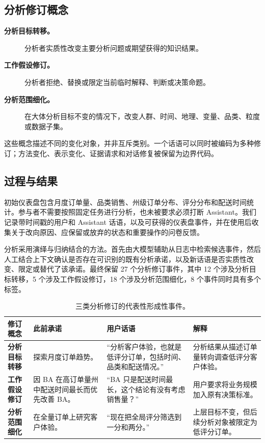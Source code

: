 \documentclass[UTF8,a4paper,10.5pt]{ctexart}
\begin{document}
\subsection{分析修订概念}

\begin{description}
\item[\textbf{分析目标转移。}]
分析者实质性改变主要分析问题或期望获得的知识结果。

\item[\textbf{工作假设修订。}]
分析者拒绝、替换或限定当前临时解释、判断或决策命题。

\item[\textbf{分析范围细化。}]
在大体分析目标不变的情况下，改变人群、时间、地理、变量、品类、粒度或数据子集。
\end{description}

这些概念描述不同的变化对象，并非互斥类别。一个话语可以同时被编码为多种修订；方法变化、表示变化、证据请求和对话修复被保留为边界代码。

\subsection{过程与结果}

初始仪表盘包含月度订单量、品类销售、州级订单分布、评分分布和配送时间统计。参与者不需要按照固定任务进行分析，也未被要求必须打断 Assistant。我们记录带时间戳的用户和 Assistant 话语，以及可获得的仪表盘事件，并在使用后收集关于改向原因、应保留或放弃的状态和重要操作的问卷反馈。

分析采用演绎与归纳结合的方法。首先由大模型辅助从日志中检索候选事件，然后人工结合上下文确认是否存在可识别的既有分析承诺，以及新话语是否实质性改变、限定或替代了该承诺。最终保留 27 个分析修订事件，其中 12 个涉及分析目标转移，5 个涉及工作假设修订，18 个涉及分析范围细化，8 个事件同时具有多个标签。

\begin{table}[t]
\centering
\caption{三类分析修订的代表性形成性事件。}
\label{tab:formative-episodes-zh}
\small
\begin{tabularx}{\textwidth}{p{}p{}Xp{}}
\toprule
\textbf{修订概念} & \textbf{此前承诺} & \textbf{用户话语} & \textbf{解释} \\
\midrule
\textbf{分析目标转移} & 探索月度订单趋势。 & “分析客户体验，也就是低评分订单，包括时间、品类和配送情况。” & 分析结果从描述订单量转向调查低评分客户体验。 \\
\textbf{工作假设修订} & 因 BA 在高订单量州中配送时间最长而优先改善 BA。 & “BA 只是配送时间最长，这个结论有没有考虑销售量？” & 用户要求将业务规模加入原有决策标准。 \\
\textbf{分析范围细化} & 在全量订单上研究客户体验。 & “现在把全局评分筛选到一分和两分。” & 上层目标不变，但后续分析对象被限定为低评分订单。 \\
\bottomrule
\end{tabularx}
\end{table}
\end{document}
